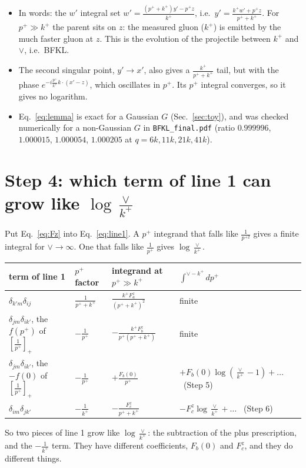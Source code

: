 \documentclass[10pt]{article}
\numberwithin{equation}{section}
\begin{document}
\begin{itemize}
\item In words: the $w'$ integral set $w'=\frac{(p^++k^+)y'-p^+z}{k^+}$, i.e.\ $y'=\frac{k^+w'+p^+z}{p^++k^+}$. For $p^+\gg k^+$ the parent sits on $z$: the measured gluon ($k^+$) is emitted by the much faster gluon at $z$. This is the evolution of the projectile between $k^+$ and $\vee$, i.e.\ BFKL.
\item The second singular point, $y'\to x'$, also gives a $\frac{k^+}{p^++k^+}$ tail, but with the phase $e^{-i\frac{p^+}{k^+}k\cdot(x'-z)}$, which oscillates in $p^+$. Its $p^+$ integral converges, so it gives no logarithm.
\item Eq.~\eqref{eq:lemma} is exact for a Gaussian $G$ (Sec.~\ref{sec:toy}), and was checked numerically for a non-Gaussian $G$ in \texttt{BFKL\_final.pdf} (ratio $0.999996$, $1.000015$, $1.000054$, $1.000205$ at $q=6k,11k,21k,41k$).
\end{itemize}

\section{Step 4: which term of line 1 can grow like \texorpdfstring{$\log\frac{\vee}{k^+}$}{log(vee/k+)}}
Put Eq.~\eqref{eq:Fz} into Eq.~\eqref{eq:line1}. A $p^+$ integrand that falls like $\frac{1}{p^{+2}}$ gives a finite integral for $\vee\to\infty$. One that falls like $\frac{1}{p^+}$ gives $\log\frac{\vee}{k^+}$.
\begin{center}
\renewcommand{\arraystretch}{1.6}
\begin{tabular}{llll}
\toprule
term of line 1 & $p^+$ factor & integrand at $p^+\gg k^+$ & $\int^{\vee-k^+}dp^+$\\\midrule
$\delta_{k'm}\delta_{ij}$ & $\frac{1}{p^++k^+}$ & $\frac{k^+F_a^z}{(p^++k^+)^2}$ & finite\\
$\delta_{jm}\delta_{ik'}$, the $f(p^+)$ of $[\frac{1}{p^+}]_+$ & $-\frac{1}{p^+}$ & $-\frac{k^+F_b^z}{p^+(p^++k^+)}$ & finite\\
$\delta_{jm}\delta_{ik'}$, the $-f(0)$ of $[\frac{1}{p^+}]_+$ & $-\frac{1}{p^+}$ & $+\frac{F_b(0)}{p^+}$ & $+F_b(0)\log(\frac{\vee}{k^+}-1)+\dots$ \ (Step 5)\\
$\delta_{im}\delta_{jk'}$ & $-\frac{1}{k^+}$ & $-\frac{F_c^z}{p^++k^+}$ & $-F_c^z\log\frac{\vee}{k^+}+\dots$ \ (Step 6)\\\bottomrule
\end{tabular}
\end{center}
So two pieces of line 1 grow like $\log\frac{\vee}{k^+}$: the subtraction of the plus prescription, and the $-\frac{1}{k^+}$ term. They have different coefficients, $F_b(0)$ and $F_c^z$, and they do different things.
\end{document}
